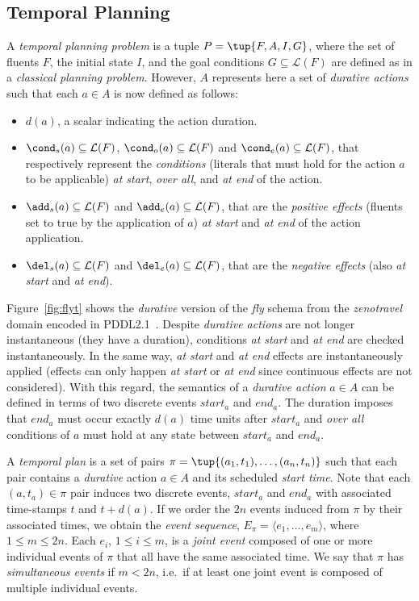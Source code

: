 \documentclass[runningheads]{llncs}
\begin{document}
\subsection{Temporal Planning}
A {\em temporal planning problem} is a tuple $P=\tup{F,A,I,G}$, where the set of fluents $F$, the initial state $I$, and the goal conditions $G\subseteq\mathcal{L}(F)$ are defined as in a {\em classical planning problem}. However, $A$ represents here a set of {\em durative actions} such that each $a\in A$ is now defined as follows:
\begin{itemize}
\item $d(a)$, a scalar indicating the action duration.
\item $\cond_s(a)\subseteq\mathcal{L}(F)$, $\cond_o(a)\subseteq\mathcal{L}(F)$ and $\cond_e(a)\subseteq\mathcal{L}(F)$, that respectively represent the {\em conditions} (literals that must hold for the action $a$ to be applicable) {\em at start}, {\em over all}, and {\em at end} of the action.

\item $\add_s(a)\subseteq\mathcal{L}(F)$ and $\add_e(a)\subseteq\mathcal{L}(F)$, that are the {\em positive effects} (fluents set to true by the application of $a$) {\em at start} and {\em at end} of the action application.
\item  $\del_s(a)\subseteq\mathcal{L}(F)$ and $\del_e(a)\subseteq\mathcal{L}(F)$, that are the {\em negative effects} (also {\em at start} and {\em at end}).
\end{itemize}

Figure~\ref{fig:flyt} shows the {\em durative} version of the {\em fly} schema from the {\em zenotravel} domain encoded in PDDL2.1~\cite{fox2003pddl2}. Despite {\em durative actions} are not longer instantaneous (they have a duration), conditions {\em at start} and {\em at end} are checked instantaneously. In the same way, {\em at start} and {\em at end} effects are instantaneously applied (effects can only happen {\em at start} or {\em at end} since continuous effects are not considered). With this regard, the semantics of a {\em durative action} $a\in A$ can be defined in terms of two discrete events $start_a$ and $end_a$. The duration imposes that $end_a$ must occur exactly $d(a)$ time units after $start_a$ and {\em over all} conditions of $a$ must hold at any state between $start_a$ and $end_a$.

A {\em temporal plan} is a set of pairs $\pi=\tup{(a_1,t_1), \ldots, (a_n,t_n)}$ such that each pair contains a {\em durative} action $a\in A$ and its scheduled {\em start time}. Note that each $(a,t_a)\in \pi$ pair induces two discrete events, $start_a$ and $end_a$ with associated time-stamps $t$ and $t+d(a)$. If we order the $2n$ events induced from $\pi$ by their associated times, we obtain the {\em event sequence}, $E_{\pi}=\langle e_1,\ldots,e_m\rangle$, where {\small $1\leq m\leq 2n$}. Each $e_i$, {\small $1\leq i\leq m$}, is a {\em joint event} composed of one or more individual events of $\pi$ that all have the same associated time. We say that $\pi$ has {\em simultaneous events} if $m<2n$, i.e.~if at least one joint event is composed of multiple individual events.
\end{document}
